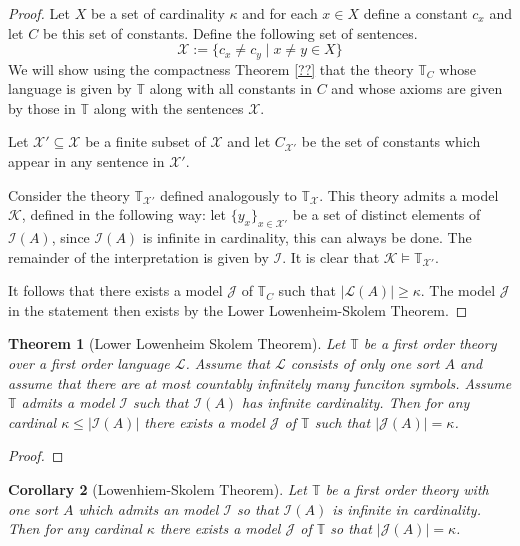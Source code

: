 \documentclass[12pt]{article}
\theoremstyle{plain}
\newtheorem{thm}{Theorem}[subsection] %
\newtheorem{cor}[thm]{Corollary}
\theoremstyle{definition}
\newcommand{\bb}[1]{\mathbb{#1}}
\newcommand{\scr}[1]{\mathscr{#1}}
\newcommand{\call}[1]{\mathcal{#1}}
\begin{document}
	\begin{proof}
		Let $X$ be a set of cardinality $\kappa$ and for each $x \in X$ define a constant $c_x$ and let $C$ be this set of constants. Define the following set of sentences.
		\begin{equation}
			\scr{X} := \{ c_x \neq c_y \mid x \neq y \in X \}
			\end{equation}
		We will show using the compactness Theorem \ref{??} that the theory $\bb{T}_C$ whose language is given by $\bb{T}$ along with all constants in $C$ and whose axioms are given by those in $\bb{T}$ along with the sentences $\scr{X}$.
		
		Let $\scr{X}' \subseteq \scr{X}$ be a finite subset of $\scr{X}$ and let $C_{\scr{X}'}$ be the set of constants which appear in any sentence in $\scr{X}'$.
		
		Consider the theory $\bb{T}_{\scr{X}'}$ defined analogously to $\bb{T}_{\scr{X}}$. This theory admits a model $\call{K}$, defined in the following way: let $\{ y_x \}_{x \in \scr{X}'}$ be a set of distinct elements of $\call{I}(A)$, since $\call{I}(A)$ is infinite in cardinality, this can always be done. The remainder of the interpretation is given by $\call{I}$. It is clear that $\call{K} \models \bb{T}_{\scr{X}'}$.
		
		It follows that there exists a model $\call{J}$ of $\bb{T}_C$ such that $|\call{L}(A)| \geq \kappa$. The model $\call{J}$ in the statement then exists by the Lower Lowenheim-Skolem Theorem.
		\end{proof}
	
	\begin{thm}[Lower Lowenheim Skolem Theorem]
		Let $\bb{T}$ be a first order theory over a first order language $\call{L}$. Assume that $\call{L}$ consists of only one sort $A$ and assume that there are at most countably infinitely many funciton symbols. Assume $\bb{T}$ admits a model $\call{I}$ such that $\call{I}(A)$ has infinite cardinality. Then for any cardinal $\kappa \leq |\call{I}(A)|$ there exists a model $\call{J}$ of $\bb{T}$ such that $|\call{J}(A)| = \kappa$.
		\end{thm}
	\begin{proof}
		
		\end{proof}
	
	
	
	
	
	
	
	\begin{cor}[Lowenhiem-Skolem Theorem]
		Let $\bb{T}$ be a first order theory with one sort $A$ which admits an model $\call{I}$ so that $\call{I}(A)$ is infinite in cardinality. Then for any cardinal $\kappa$ there exists a model $\call{J}$ of $\bb{T}$ so that $|\call{J}(A)| = \kappa$.
		\end{cor}
	
\end{document}
